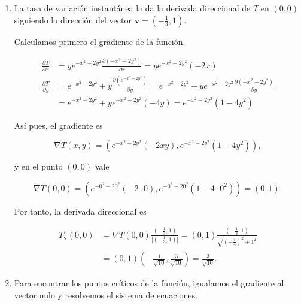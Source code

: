 \documentclass[
  spanish,
  a4paper,
]{scrreport}
\theoremstyle{definition}
\theoremstyle{remark}
\begin{document}
\begin{tcolorbox}[enhanced jigsaw, arc=.35mm, bottomrule=.15mm, bottomtitle=1mm, breakable, colback=white, colbacktitle=quarto-callout-tip-color!10!white, colframe=quarto-callout-tip-color-frame, coltitle=black, left=2mm, leftrule=.75mm, opacityback=0, opacitybacktitle=0.6, rightrule=.15mm, title=\textcolor{quarto-callout-tip-color}{\faLightbulb}\hspace{0.5em}{Solución}, titlerule=0mm, toprule=.15mm, toptitle=1mm]

\begin{enumerate}
\def\labelenumi{\alph{enumi}.}
\item
  La tasa de variación instantánea la da la derivada direccional de
  \(T\) en \((0,0)\) siguiendo la dirección del vector
  \(\mathbf{v} =\left(-\frac{1}{3}, 1\right)\).

  Calculamos primero el gradiente de la función.

  \begin{align*}
  \frac{\partial T}{\partial x}
  &= ye^{-x^2-2y^2}\frac{\partial (-x^2-2y^2)}{\partial x}
  = ye^{-x^2-2y^2}(-2x) \\
  \frac{\partial T}{\partial y}
  &= e^{-x^2-2y^2} + y\frac{\partial \left(e^{-x^2-2y^2}\right)}{\partial y}
  = e^{-x^2-2y^2} + ye^{-x^2-2y^2}\frac{\partial (-x^2-2y^2)}{\partial y} \\
  &= e^{-x^2-2y^2} + ye^{-x^2-2y^2}(-4y) 
  = e^{-x^2-2y^2}(1-4y^2)
  \end{align*}

  Así pues, el gradiente es

  \[\nabla T(x,y) = \left(e^{-x^2-2y^2}(-2xy), e^{-x^2-2y^2}(1-4y^2)\right),\]

  y en el punto \((0,0)\) vale

  \[
  \nabla T(0,0) = \left(e^{-0^2-20^2}(-2\cdot 0), e^{-0^2-20^2}(1-4\cdot 0^2)\right) = (0, 1).
  \]

  Por tanto, la derivada direccional es

  \begin{align*}
  T_{\mathbf{v}}(0,0) 
  &= \nabla T(0,0)\frac{\left(-\frac{1}{3}, 1\right)}{\left|\left(-\frac{1}{3}, 1\right)\right|}
  = (0,1)\frac{\left(-\frac{1}{3}, 1\right)}{\sqrt{\left(-\frac{1}{3}\right)^2+1^2}} \\
  & = (0,1)\left(-\frac{1}{\sqrt{10}}, \frac{3}{\sqrt{10}}\right)
  = \frac{3}{\sqrt{10}}.
  \end{align*}
\item
  Para encontrar los puntos críticos de la función, igualamos el
  gradiente al vector nulo y resolvemos el sistema de ecuaciones.


\end{enumerate}
\end{tcolorbox}
\end{document}
